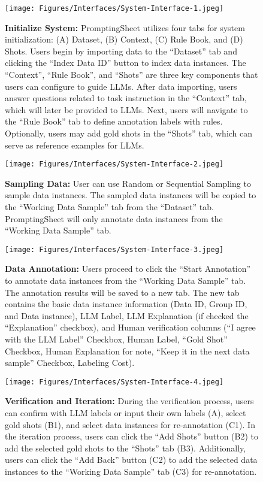 \begin{figure}
    \centering
    \texttt{[image: Figures/Interfaces/System-Interface-1.jpeg]}
    \caption{\textbf{Initialize System:} PromptingSheet utilizes four tabs for system initialization: (A) Dataset, (B) Context, (C) Rule Book, and (D) Shots. Users begin by importing data to the ``Dataset'' tab and clicking the ``Index Data ID'' button to index data instances. The ``Context'', ``Rule Book'', and ``Shots'' are three key components that users can configure to guide LLMs. After data importing, users answer questions related to task instruction in the ``Context'' tab, which will later be provided to LLMs. Next, users will navigate to the ``Rule Book'' tab to define annotation labels with rules. Optionally, users may add gold shots in the ``Shots'' tab, which can serve as reference examples for LLMs.}
    \label{fig:system-interface-1}
\end{figure}
\begin{figure}
    \centering
    \texttt{[image: Figures/Interfaces/System-Interface-2.jpeg]}
    \caption{\textbf{Sampling Data:} User can use Random or Sequential Sampling to sample data instances. The sampled data instances will be copied to the ``Working Data Sample'' tab from the ``Dataset'' tab. PromptingSheet will only annotate data instances from the ``Working Data Sample'' tab.}
    \label{fig:system-interface-2}
\end{figure}
\begin{figure}
    \centering
    \texttt{[image: Figures/Interfaces/System-Interface-3.jpeg]}
    \caption{\textbf{Data Annotation: }Users proceed to click the ``Start Annotation'' to annotate data instances from the ``Working Data Sample'' tab. The annotation results will be saved to a new tab. The new tab contains the basic data instance information (Data ID, Group ID, and Data instance), LLM Label, LLM Explanation (if checked the ``Explanation'' checkbox), and Human verification columns (``I agree with the LLM Label'' Checkbox, Human Label, ``Gold Shot'' Checkbox, Human Explanation for note, ``Keep it in the next data sample'' Checkbox, Labeling Cost). }
    \label{fig:system-interface-3}
\end{figure}
\begin{figure}
    \centering
    \texttt{[image: Figures/Interfaces/System-Interface-4.jpeg]}
    \caption{\textbf{Verification and Iteration: } During the verification process, users can confirm with LLM labels or input their own labels (A), select gold shots (B1), and select data instances for re-annotation (C1). 
    In the iteration process, 
    users can click the ``Add Shots'' button (B2) to add the selected gold shots to the ``Shots'' tab (B3). 
    Additionally, users can click the ``Add Back'' button (C2) to add the selected data instances to the ``Working Data Sample'' tab (C3) for re-annotation.}
    \label{fig:system-interface-4}
\end{figure}
